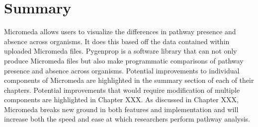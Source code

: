 \section{Summary}

Micromeda allows users to visualize the differences in pathway presence and absence across organisms. It does this based off the data contained within uploaded Micromeda files. Pygenprop is a software library that can not only produce Micromeda files but also make programmatic comparisons of pathway presence and absence across organisms. Potential improvements to individual components of Micromeda are highlighted in the summary section of each of their chapters. Potential improvements that would require modification of multiple components are highlighted in Chapter XXX. As discussed in Chapter XXX, Micromeda breaks new ground in both features and implementation and will increase both the speed and ease at which researchers perform pathway analysis.